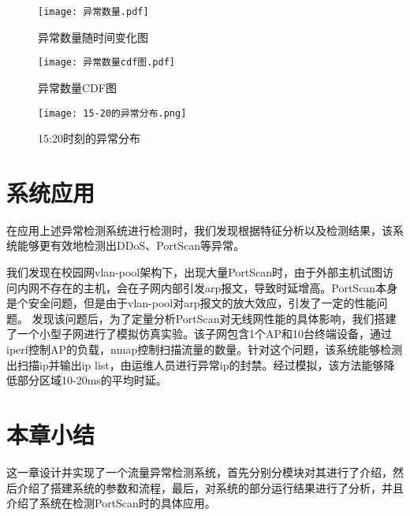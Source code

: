 



\begin{figure}
  \centering
  \texttt{[image: 异常数量.pdf]}
  \caption{异常数量随时间变化图}
  \label{fig:异常数量}
\end{figure}

\begin{figure}[htbp]
  \centering
  \begin{minipage}[t]{0.48\textwidth}
  \centering
  \texttt{[image: 异常数量cdf图.pdf]}
  \caption{异常数量CDF图}
  \end{minipage}
  \begin{minipage}[t]{0.48\textwidth}
  \centering
  \texttt{[image: 15-20的异常分布.png]}
  \caption{15:20时刻的异常分布}
  \end{minipage}
  \end{figure}


\section{系统应用}
在应用上述异常检测系统进行检测时，我们发现根据特征分析以及检测结果，该系统能够更有效地检测出DDoS、PortScan等异常。

我们发现在校园网vlan-pool架构下，出现大量PortScan时，由于外部主机试图访问内网不存在的主机，会在子网内部引发arp报文，导致时延增高。PortScan本身是个安全问题，但是由于vlan-pool对arp报文的放大效应，引发了一定的性能问题。
发现该问题后，为了定量分析PortScan对无线网性能的具体影响，我们搭建了一个小型子网进行了模拟仿真实验。该子网包含1个AP和10台终端设备，通过iperf控制AP的负载，nmap控制扫描流量的数量。针对这个问题，该系统能够检测出扫描ip并输出ip list，由运维人员进行异常ip的封禁。经过模拟，该方法能够降低部分区域10-20ms的平均时延。

\section{本章小结}
这一章设计并实现了一个流量异常检测系统，首先分别分模块对其进行了介绍，然后介绍了搭建系统的参数和流程，最后，对系统的部分运行结果进行了分析，并且介绍了系统在检测PortScan时的具体应用。